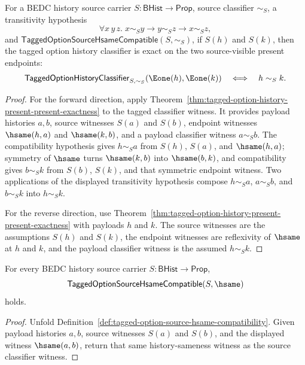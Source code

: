 \begin{theorem}
\label{thm:tagged-option-history-visible-present-exactness}
For a BEDC history source carrier $S:\mathsf{BHist}\to\mathsf{Prop}$, source classifier $\sim_S$, a transitivity hypothesis
$$
\forall x\,y\,z.\;x\sim_S y\to y\sim_S z\to x\sim_S z,
$$
and $\mathsf{TaggedOptionSourceHsameCompatible}(S,\sim_S)$, if $S(h)$ and $S(k)$, then the tagged option history classifier is exact on the two source-visible present endpoints:
$$
\mathsf{TaggedOptionHistoryClassifier}_{S,\sim_S}(\Eone(h),\Eone(k))
\quad\Longleftrightarrow\quad
h\sim_S k.
$$
\end{theorem}
\begin{proof}
For the forward direction, apply Theorem~\ref{thm:tagged-option-history-present-present-exactness} to the tagged classifier witness. It provides payload histories $a,b$, source witnesses $S(a)$ and $S(b)$, endpoint witnesses $\hsame(h,a)$ and $\hsame(k,b)$, and a payload classifier witness $a\sim_S b$. The compatibility hypothesis gives $h\sim_S a$ from $S(h)$, $S(a)$, and $\hsame(h,a)$; symmetry of $\hsame$ turns $\hsame(k,b)$ into $\hsame(b,k)$, and compatibility gives $b\sim_S k$ from $S(b)$, $S(k)$, and that symmetric endpoint witness. Two applications of the displayed transitivity hypothesis compose $h\sim_S a$, $a\sim_S b$, and $b\sim_S k$ into $h\sim_S k$.

For the reverse direction, use Theorem~\ref{thm:tagged-option-history-present-present-exactness} with payloads $h$ and $k$. The source witnesses are the assumptions $S(h)$ and $S(k)$, the endpoint witnesses are reflexivity of $\hsame$ at $h$ and $k$, and the payload classifier witness is the assumed $h\sim_S k$.
\end{proof}

\begin{theorem}
\label{thm:tagged-option-source-hsame-compatibility-hsame}
For every BEDC history source carrier $S:\mathsf{BHist}\to\mathsf{Prop}$,
$$
\mathsf{TaggedOptionSourceHsameCompatible}(S,\hsame)
$$
holds.
\end{theorem}
\begin{proof}
Unfold Definition~\ref{def:tagged-option-source-hsame-compatibility}. Given payload histories $a,b$, source witnesses $S(a)$ and $S(b)$, and the displayed witness $\hsame(a,b)$, return that same history-sameness witness as the source classifier witness.
\end{proof}

